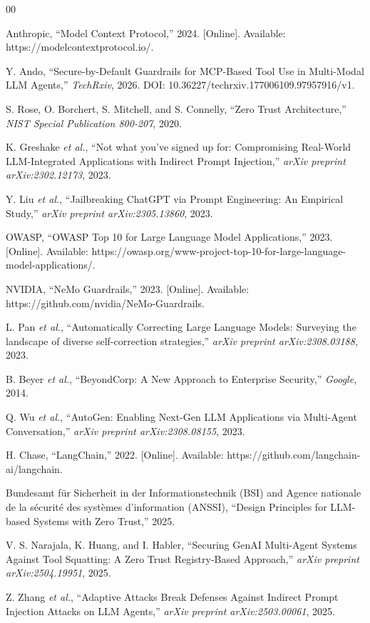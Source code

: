 \documentclass[conference]{IEEEtran}
\begin{document}
\balance
\begin{thebibliography}{00}
\raggedright

 Anthropic, ``Model Context Protocol,'' 2024. [Online]. Available: https://modelcontextprotocol.io/.

 Y. Ando, ``Secure-by-Default Guardrails for MCP-Based Tool Use in Multi-Modal LLM Agents,'' \textit{TechRxiv}, 2026. DOI: 10.36227/techrxiv.177006109.97957916/v1.

 S. Rose, O. Borchert, S. Mitchell, and S. Connelly, ``Zero Trust Architecture,'' \textit{NIST Special Publication 800-207}, 2020.

 K. Greshake \textit{et al.}, ``Not what you've signed up for: Compromising Real-World LLM-Integrated Applications with Indirect Prompt Injection,'' \textit{arXiv preprint arXiv:2302.12173}, 2023.

 Y. Liu \textit{et al.}, ``Jailbreaking ChatGPT via Prompt Engineering: An Empirical Study,'' \textit{arXiv preprint arXiv:2305.13860}, 2023.

 OWASP, ``OWASP Top 10 for Large Language Model Applications,'' 2023. [Online]. Available: https://owasp.org/www-project-top-10-for-large-language-model-applications/.

 NVIDIA, ``NeMo Guardrails,'' 2023. [Online]. Available: https://github.com/nvidia/NeMo-Guardrails.

 L. Pan \textit{et al.}, ``Automatically Correcting Large Language Models: Surveying the landscape of diverse self-correction strategies,'' \textit{arXiv preprint arXiv:2308.03188}, 2023.

 B. Beyer \textit{et al.}, ``BeyondCorp: A New Approach to Enterprise Security,'' \textit{Google}, 2014.

 Q. Wu \textit{et al.}, ``AutoGen: Enabling Next-Gen LLM Applications via Multi-Agent Conversation,'' \textit{arXiv preprint arXiv:2308.08155}, 2023.

 H. Chase, ``LangChain,'' 2022. [Online]. Available: https://github.com/langchain-ai/langchain.

 Bundesamt für Sicherheit in der Informationstechnik (BSI) and Agence nationale de la sécurité des systèmes d'information (ANSSI), ``Design Principles for LLM-based Systems with Zero Trust,'' 2025.

 V. S. Narajala, K. Huang, and I. Habler, ``Securing GenAI Multi-Agent Systems Against Tool Squatting: A Zero Trust Registry-Based Approach,'' \textit{arXiv preprint arXiv:2504.19951}, 2025.

 Z. Zhang \textit{et al.}, ``Adaptive Attacks Break Defenses Against Indirect Prompt Injection Attacks on LLM Agents,'' \textit{arXiv preprint arXiv:2503.00061}, 2025.

\end{thebibliography}
\end{document}
